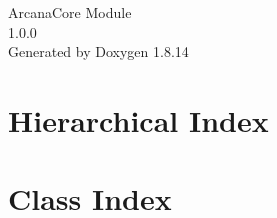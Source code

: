 \documentclass[twoside]{book}
\newcommand{\+}{\discretionary{\mbox{\scriptsize$\hookleftarrow$}}{}{}}
\newcommand{\clearemptydoublepage}{%
  \newpage{\pagestyle{empty}\cleardoublepage}%
}
\begin{document}
\hypersetup{pageanchor=false,
             bookmarksnumbered=true,
             pdfencoding=unicode
            }
\begin{titlepage}
\vspace*{7cm}
\begin{center}%
{\Large Arcana\+Core Module \\[1ex]\large 1.\+0.\+0 }\\
\vspace*{1cm}
{\large Generated by Doxygen 1.8.14}\\
\end{center}
\end{titlepage}
\clearemptydoublepage
{}
\tableofcontents
\clearemptydoublepage
{}
\hypersetup{pageanchor=true}

\chapter{Hierarchical Index}

\chapter{Class Index}

\end{document}
